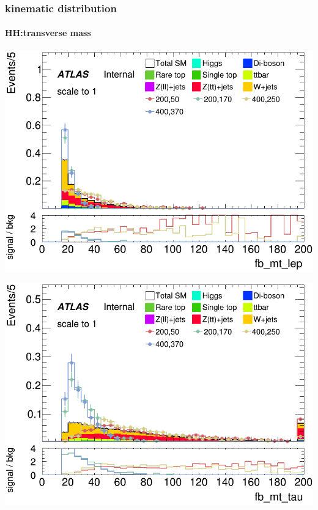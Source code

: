 \documentclass[usenames,dvipsnames]{beamer}
\begin{document}
\begin{frame}
	\frametitle{kinematic distribution}
	\framesubtitle{HH:transverse mass}
	    \begin{minipage}{0.25\textwidth}
        \centering
        \includegraphics[width=\textwidth]{graphics/HH_met_sig/HH_fb_mt_lep_norm.png}
    \end{minipage}
    \hfill
    \begin{minipage}{0.25\textwidth}
        \centering
        \includegraphics[width=\textwidth]{graphics/HH_met_sig/HH_fb_mt_tau_norm.png}
    \end{minipage}
    \hfill
    \begin{minipage}{0.25\textwidth}
        \centering

\end{minipage}
\end{frame}
\end{document}
